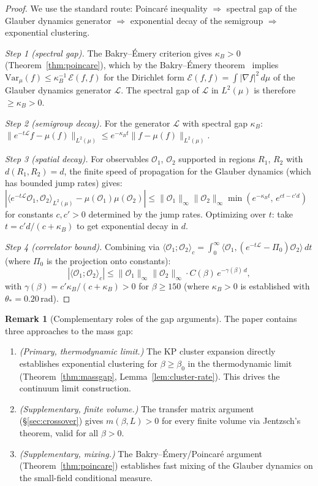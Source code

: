 \documentclass[11pt]{article}
\theoremstyle{definition}
\newtheorem{remark}[theorem]{Remark}
\begin{document}
\begin{proof}
We use the standard route: Poincar\'e inequality $\Rightarrow$ spectral
gap of the Glauber dynamics generator $\Rightarrow$ exponential decay
of the semigroup $\Rightarrow$ exponential clustering.

\textit{Step 1 (spectral gap).}
The Bakry--\'Emery criterion gives $\kappa_B>0$
(Theorem~\ref{thm:poincare}), which by the Bakry--\'Emery
theorem~\cite{BakryEmery} implies $\mathrm{Var}_\mu(f)\le
\kappa_B^{-1}\,\mathcal{E}(f,f)$ for the Dirichlet form
$\mathcal{E}(f,f)=\int|\nabla f|^2\,d\mu$ of the Glauber dynamics
generator $\mathcal{L}$.  The spectral gap of $\mathcal{L}$ in
$L^2(\mu)$ is therefore $\ge\kappa_B>0$.

\textit{Step 2 (semigroup decay).}
For the generator $\mathcal{L}$ with spectral gap $\kappa_B$:
$\|e^{-t\mathcal{L}}f-\mu(f)\|_{L^2(\mu)}
\le e^{-\kappa_B t}\|f-\mu(f)\|_{L^2(\mu)}$.

\textit{Step 3 (spatial decay).}
For observables $\mathcal{O}_1$, $\mathcal{O}_2$ supported in regions
$R_1$, $R_2$ with $d(R_1,R_2)=d$, the finite speed of propagation
for the Glauber dynamics (which has bounded jump rates) gives:
$|\langle e^{-t\mathcal{L}}\mathcal{O}_1,
\mathcal{O}_2\rangle_{L^2(\mu)}-\mu(\mathcal{O}_1)\mu(\mathcal{O}_2)|
\le\|\mathcal{O}_1\|_\infty\|\mathcal{O}_2\|_\infty
\min(e^{-\kappa_B t},\,e^{ct-c'd})$
for constants $c,c'>0$ determined by the jump rates.  Optimizing over
$t$: take $t=c'd/(c+\kappa_B)$ to get exponential decay in $d$.

\textit{Step 4 (correlator bound).}
Combining via $\langle\mathcal{O}_1;\mathcal{O}_2\rangle_c
=\int_0^\infty\langle\mathcal{O}_1,
(e^{-t\mathcal{L}}-\Pi_0)\mathcal{O}_2\rangle\,dt$
(where $\Pi_0$ is the projection onto constants):
\[
|\langle\mathcal{O}_1;\mathcal{O}_2\rangle_c|
\le\|\mathcal{O}_1\|_\infty\|\mathcal{O}_2\|_\infty
\cdot C(\beta)\,e^{-\gamma(\beta)\,d},
\]
with $\gamma(\beta)=c'\kappa_B/(c+\kappa_B)>0$ for $\beta\ge 150$
(where $\kappa_B>0$ is established with $\theta_*=0.20$\,rad).
\end{proof}

\begin{remark}[Complementary roles of the gap arguments]
The paper contains three approaches to the mass gap:
\begin{enumerate}[nosep]
\item \emph{(Primary, thermodynamic limit.)} The KP cluster
expansion directly establishes exponential clustering for
$\beta\ge\beta_0$ in the thermodynamic limit
(Theorem~\ref{thm:massgap}, Lemma~\ref{lem:cluster-rate}).
This drives the continuum limit construction.
\item \emph{(Supplementary, finite volume.)}
The transfer matrix argument (\S\ref{sec:crossover}) gives
$m(\beta,L)>0$ for every finite volume via Jentzsch's theorem,
valid for all $\beta>0$.
\item \emph{(Supplementary, mixing.)}
The Bakry--\'Emery/Poincar\'e argument
(Theorem~\ref{thm:poincare}) establishes fast mixing
of the Glauber dynamics on the small-field conditional
measure.
\end{enumerate}
\end{remark}
\end{document}
